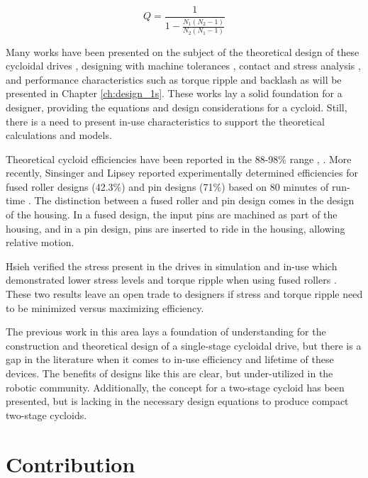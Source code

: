 \begin{equation} \label{eq:two_stage_ratio}
Q = \frac{1}{1 - \frac{N_1 (N_2-1)}{N_2 (N_1-1)}}
\end{equation}

Many works have been presented on the subject of the theoretical design of these cycloidal drives \cite{ref:on_the_lobe} \cite{ref:hwang_hsieh}, designing with machine tolerances \cite{ref:design_and_application}, contact and stress analysis \cite{ref:li}, and performance characteristics such as torque ripple and backlash \cite{ref:hsieh_traditional} \cite{ref:hsieh_dynamics} as will be presented in Chapter \ref{ch:design_1s}.
These works lay a solid foundation for a designer, providing the equations and design considerations for a cycloid.
Still, there is a need to present in-use characteristics to support the theoretical calculations and models.

Theoretical cycloid efficiencies have been reported in the 88-98\% range \cite{ref:malhorta_2}, \cite{ref:unified_approach}.
More recently, Sinsinger and Lipsey reported experimentally determined efficiencies for fused roller designs (42.3\%) and pin designs (71\%) based on 80 minutes of run-time \cite{ref:cycloid_vs_harmonic}.
The distinction between a fused roller and pin design comes in the design of the housing.
In a fused design, the input pins are machined as part of the housing, and in a pin design, pins are inserted to ride in the housing, allowing relative motion.

Hsieh verified the stress present in the drives in simulation and in-use which demonstrated lower stress levels and torque ripple when using fused rollers \cite{ref:hsieh_dynamics}.
These two results leave an open trade to designers if stress and torque ripple need to be minimized versus maximizing efficiency.

The previous work in this area lays a foundation of understanding for the construction and theoretical design of a single-stage cycloidal drive, but there is a gap in the literature when it comes to in-use efficiency and lifetime of these devices. The benefits of designs like this are clear, but under-utilized in the robotic community. Additionally, the concept for a two-stage cycloid has been presented, but is lacking in the necessary design equations to produce compact two-stage cycloids. 

\section{Contribution} \label{intro:contribution}

